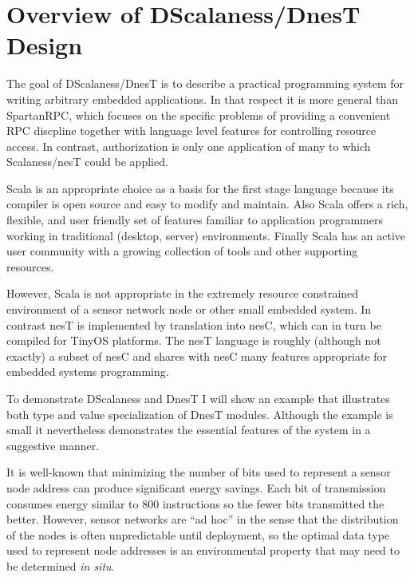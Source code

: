 \section{Overview of DScalaness/DnesT Design}

The goal of DScalaness/DnesT is to describe a practical programming system for writing arbitrary
embedded applications. In that respect it is more general than SpartanRPC, which focuses on the
specific problems of providing a convenient RPC discpline together with language level features
for controlling resource access. In contrast, authorization is only one application of many to
which Scalaness/nesT could be applied.

Scala is an appropriate choice as a basis for the first stage language because its compiler is
open source and easy to modify and maintain. Also Scala offers a rich, flexible, and user
friendly set of features familiar to application programmers working in traditional (desktop,
server) environments. Finally Scala has an active user community with a growing collection of
tools and other supporting resources.

However, Scala is not appropriate in the extremely resource constrained environment of a sensor
network node or other small embedded system. In contrast nesT is implemented by translation into
nesC, which can in turn be compiled for TinyOS platforms. The nesT language is roughly (although
not exactly) a subset of nesC and shares with nesC many features appropriate for embedded
systems programming.

To demonstrate DScalaness and DnesT I will show an example that illustrates both type and value
specialization of DnesT modules. Although the example is small it nevertheless demonstrates the
essential features of the system in a suggestive manner.

It is well-known that minimizing the number of bits used to represent a sensor node address can
produce significant energy savings. Each bit of transmission consumes energy similar to 800
instructions \cite{tag} so the fewer bits transmitted the better. However, sensor networks are
``ad hoc'' in the sense that the distribution of the nodes is often unpredictable until
deployment, so the optimal data type used to represent node addresses is an environmental
property that may need to be determined \emph{in situ}.

